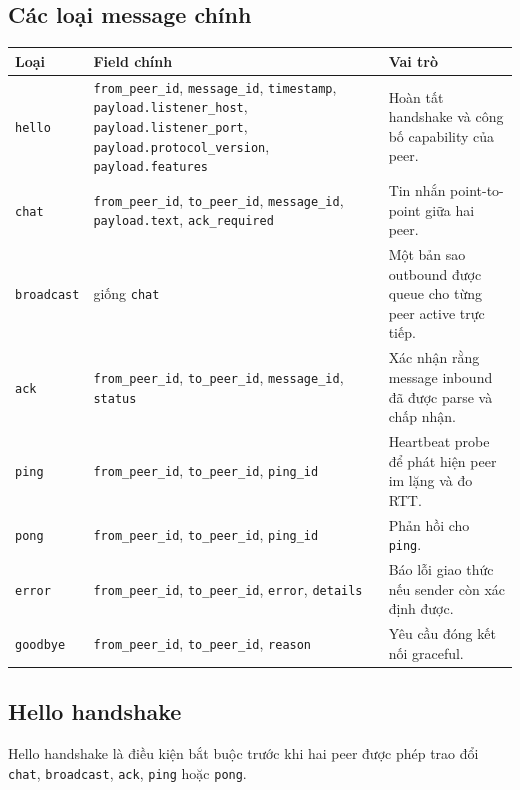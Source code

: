 \subsection{Các loại message chính}
\begin{longtable}{|p{2.8cm}|p{3.7cm}|p{6cm}|}
\hline
\textbf{Loại} & \textbf{Field chính} & \textbf{Vai trò} \\
\hline
\texttt{hello} & \texttt{from\_peer\_id}, \texttt{message\_id}, \texttt{timestamp}, \texttt{payload.listener\_host}, \texttt{payload.listener\_port}, \texttt{payload.protocol\_version}, \texttt{payload.features} & Hoàn tất handshake và công bố capability của peer. \\
\hline
\texttt{chat} & \texttt{from\_peer\_id}, \texttt{to\_peer\_id}, \texttt{message\_id}, \texttt{payload.text}, \texttt{ack\_required} & Tin nhắn point-to-point giữa hai peer. \\
\hline
\texttt{broadcast} & giống \texttt{chat} & Một bản sao outbound được queue cho từng peer active trực tiếp. \\
\hline
\texttt{ack} & \texttt{from\_peer\_id}, \texttt{to\_peer\_id}, \texttt{message\_id}, \texttt{status} & Xác nhận rằng message inbound đã được parse và chấp nhận. \\
\hline
\texttt{ping} & \texttt{from\_peer\_id}, \texttt{to\_peer\_id}, \texttt{ping\_id} & Heartbeat probe để phát hiện peer im lặng và đo RTT. \\
\hline
\texttt{pong} & \texttt{from\_peer\_id}, \texttt{to\_peer\_id}, \texttt{ping\_id} & Phản hồi cho \texttt{ping}. \\
\hline
\texttt{error} & \texttt{from\_peer\_id}, \texttt{to\_peer\_id}, \texttt{error}, \texttt{details} & Báo lỗi giao thức nếu sender còn xác định được. \\
\hline
\texttt{goodbye} & \texttt{from\_peer\_id}, \texttt{to\_peer\_id}, \texttt{reason} & Yêu cầu đóng kết nối graceful. \\
\hline
\end{longtable}

\subsection{Hello handshake}
Hello handshake là điều kiện bắt buộc trước khi hai peer được phép trao đổi \texttt{chat}, \texttt{broadcast}, \texttt{ack}, \texttt{ping} hoặc \texttt{pong}.

